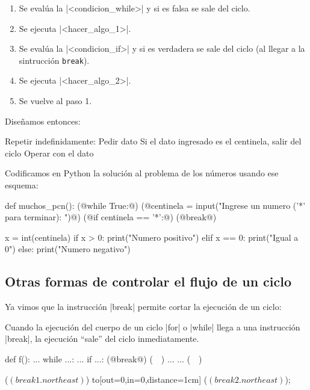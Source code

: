 \begin{enumerate}
\item Se evalúa la |<condicion_while>| y si es falsa se sale del ciclo.
\item Se ejecuta |<hacer_algo_1>|.
\item Se evalúa la |<condicion_if>| y si es verdadera se sale del ciclo (al
    llegar a la sintrucción \lstinline!break!).
\item Se ejecuta |<hacer_algo_2>|.
\item Se vuelve al paso 1.
\end{enumerate}

Diseñamos entonces:

\begin{codigo-nohl-sn}
Repetir indefinidamente:
    Pedir dato
    Si el dato ingresado es el centinela, salir del ciclo
    Operar con el dato
\end{codigo-nohl-sn}

Codificamos en Python la solución al problema de los números usando ese
esquema:

\begin{codigo-python-sn}
def muchos_pcn():
    (@while True:@)
        (@centinela = input("Ingrese un numero ('*' para terminar): ")@)
        (@if centinela == '*':@)
            (@break@)

        x = int(centinela)
        if x > 0:
            print("Numero positivo")
        elif x == 0:
            print("Igual a 0")
        else:
            print("Numero negativo")
\end{codigo-python-sn}

\subsection{Otras formas de controlar el flujo de un ciclo}

Ya vimos que la instrucción |break| permite cortar la ejecución de un ciclo:

\begin{observacion}
Cuando la ejecución del cuerpo de un ciclo |for| o |while| llega a una
instrucción |break|, la ejecución ``sale'' del ciclo inmediatamente.

\begin{codigo-python-sn}
def f():
    ...
    while ...:
        ...
        if ...:
            (@break@) (~~)
        ...
    ... (~~)
\end{codigo-python-sn}
 
    ($(break1.north east)$)
    to[out=0,in=0,distance=1cm]
    ($(break2.north east)$);
\end{observacion}

